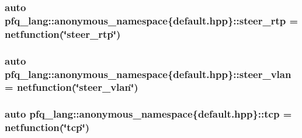 \hypertarget{namespacepfq__lang_1_1anonymous__namespace_02default_8hpp_03_a16b18fdc10f8dd8c0974d9f0d6c13af9}{
\subsubsection[{steer\+\_\+rtp}]{\setlength{\rightskip}{0pt plus 5cm}auto pfq\+\_\+lang\+::anonymous\+\_\+namespace\{default.\+hpp\}\+::steer\+\_\+rtp = {\bf netfunction}(\char`\"{}steer\+\_\+rtp\char`\"{})}}\label{namespacepfq__lang_1_1anonymous__namespace_02default_8hpp_03_a16b18fdc10f8dd8c0974d9f0d6c13af9}
\hypertarget{namespacepfq__lang_1_1anonymous__namespace_02default_8hpp_03_ad32804252244d5b572b9f5fe0cdda675}{
\subsubsection[{steer\+\_\+vlan}]{\setlength{\rightskip}{0pt plus 5cm}auto pfq\+\_\+lang\+::anonymous\+\_\+namespace\{default.\+hpp\}\+::steer\+\_\+vlan = {\bf netfunction}(\char`\"{}steer\+\_\+vlan\char`\"{})}}\label{namespacepfq__lang_1_1anonymous__namespace_02default_8hpp_03_ad32804252244d5b572b9f5fe0cdda675}
\hypertarget{namespacepfq__lang_1_1anonymous__namespace_02default_8hpp_03_a4046140746c0012b4d1ea8d3ef53f084}{
\subsubsection[{tcp}]{\setlength{\rightskip}{0pt plus 5cm}auto pfq\+\_\+lang\+::anonymous\+\_\+namespace\{default.\+hpp\}\+::tcp = {\bf netfunction}(\char`\"{}tcp\char`\"{})}}\label{namespacepfq__lang_1_1anonymous__namespace_02default_8hpp_03_a4046140746c0012b4d1ea8d3ef53f084}

